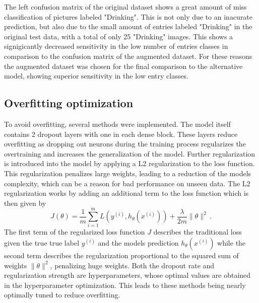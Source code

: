 \noindent
The left confusion matrix of the original dataset shows a great amount of miss classification of pictures labeled "Drinking". This is not only due to an inacurate prediction, but also due to the small amount of entries labeled "Drinking" in the original test data, with a total of only 25 "Drinking" images. This shows a signigicantly decreased sensitivity in the low number of entries classes in comparison to the confusion matrix of the augmented dataset. For these reasons the augmented dataset was chosen for the final comparison to the alternative model, showing superior sensitivity in the low entry classes.
\subsection{Overfitting optimization}
To avoid overfitting, several methods were implemented. The model itself contains 2 dropout layers with one in each dense block. These layers reduce overfitting as dropping out neurons during the training process regularizes the overtraining and increases the generalization of the model. Further regularization is introduced into the model by applying a L2 regularization to the loss function. This regularization penalizes large weights, leading to a reduction of the models complexity, which can be a reason for bad performance on unseen data.
The L2 regularization works by adding an additional term to the loss function which is then given by $$J(\theta) = \frac{1}{m} \sum_{i=1}^{m} L(y^{(i)}, h_\theta(x^{(i)})) + \frac{\lambda}{2m} \|\theta\|^2 \, .$$ The first term of the regularized loss function $J$ describes the traditional loss given the true true label $y^{\left(i\right)}$ and the models prediction $h_\theta\left(x^{\left(i\right)}\right)$ while the second term describes the regularization proportional to the squared sum of weights $\|\theta\|^2$, penalizing huge weights. Both the dropout rate and regularization strength are hyperparameters, whose optimal values are obtained in the hyperparameter optimization. This leads to these methods being nearly optimally tuned to reduce overfitting.
